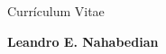 \documentclass[a4paper]{article}
\begin{document}
\begin{center}

\begin{Large}
Currículum Vitae
\end{Large}

\begin{small}
\textbf{Leandro E. Nahabedian}
\end{small}


\end{center}
\ddmmyyyydate


\end{document}
